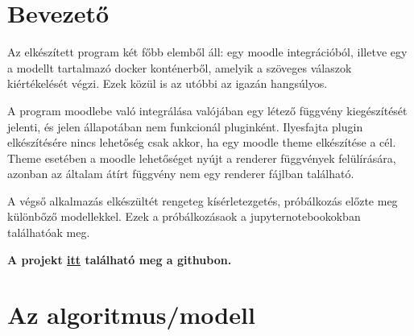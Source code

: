 \documentclass{article}
\begin{document}
\section{Bevezető}
Az elkészített program két főbb elemből áll: egy moodle integrációból, illetve egy a modellt tartalmazó docker konténerből, amelyik a szöveges válaszok kiértékelését végzi. Ezek közül is az utóbbi az igazán hangsúlyos.

A program moodlebe való integrálása valójában egy létező függvény kiegészítését jelenti, és jelen állapotában nem funkcionál pluginként. Ilyesfajta plugin elkészítésére nincs lehetőség csak akkor, ha egy moodle theme elkészítése a cél. Theme esetében a moodle lehetőséget nyújt a renderer függvények felülírására, azonban az általam átírt függvény nem egy renderer fájlban található.

A végső alkalmazás elkészültét rengeteg kísérletezgetés, próbálkozás előzte meg különbőző modellekkel. Ezek a próbálkozásaok a jupyternotebookokban találhatóak meg.

\textbf{A projekt \href{https://github.com/FogtiIstvan/Onlab-LLM}{itt} található meg a githubon.}
\section{Az algoritmus/modell}
\end{document}
